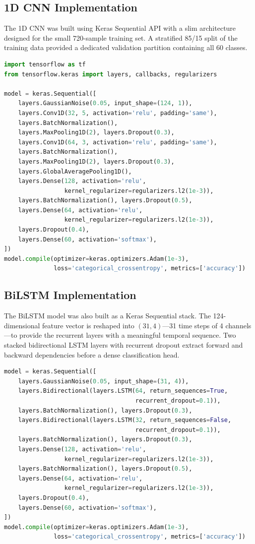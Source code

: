 \subsection{1D CNN Implementation}
The 1D CNN was built using Keras Sequential API with a slim architecture designed for the small 720-sample training set. A stratified 85/15 split of the training data provided a dedicated validation partition containing all 60 classes.
\begin{lstlisting}[language=Python]
import tensorflow as tf
from tensorflow.keras import layers, callbacks, regularizers

model = keras.Sequential([
    layers.GaussianNoise(0.05, input_shape=(124, 1)),
    layers.Conv1D(32, 5, activation='relu', padding='same'),
    layers.BatchNormalization(),
    layers.MaxPooling1D(2), layers.Dropout(0.3),
    layers.Conv1D(64, 3, activation='relu', padding='same'),
    layers.BatchNormalization(),
    layers.MaxPooling1D(2), layers.Dropout(0.3),
    layers.GlobalAveragePooling1D(),
    layers.Dense(128, activation='relu',
                 kernel_regularizer=regularizers.l2(1e-3)),
    layers.BatchNormalization(), layers.Dropout(0.5),
    layers.Dense(64, activation='relu',
                 kernel_regularizer=regularizers.l2(1e-3)),
    layers.Dropout(0.4),
    layers.Dense(60, activation='softmax'),
])
model.compile(optimizer=keras.optimizers.Adam(1e-3),
              loss='categorical_crossentropy', metrics=['accuracy'])
\end{lstlisting}

\subsection{BiLSTM Implementation}
The BiLSTM model was also built as a Keras Sequential stack. The 124-dimensional feature vector is reshaped into $(31,4)$---31 time steps of 4 channels---to provide the recurrent layers with a meaningful temporal sequence. Two stacked bidirectional LSTM layers with recurrent dropout extract forward and backward dependencies before a dense classification head.
\begin{lstlisting}[language=Python]
model = keras.Sequential([
    layers.GaussianNoise(0.05, input_shape=(31, 4)),
    layers.Bidirectional(layers.LSTM(64, return_sequences=True,
                                     recurrent_dropout=0.1)),
    layers.BatchNormalization(), layers.Dropout(0.3),
    layers.Bidirectional(layers.LSTM(32, return_sequences=False,
                                     recurrent_dropout=0.1)),
    layers.BatchNormalization(), layers.Dropout(0.3),
    layers.Dense(128, activation='relu',
                 kernel_regularizer=regularizers.l2(1e-3)),
    layers.BatchNormalization(), layers.Dropout(0.5),
    layers.Dense(64, activation='relu',
                 kernel_regularizer=regularizers.l2(1e-3)),
    layers.Dropout(0.4),
    layers.Dense(60, activation='softmax'),
])
model.compile(optimizer=keras.optimizers.Adam(1e-3),
              loss='categorical_crossentropy', metrics=['accuracy'])
\end{lstlisting}

